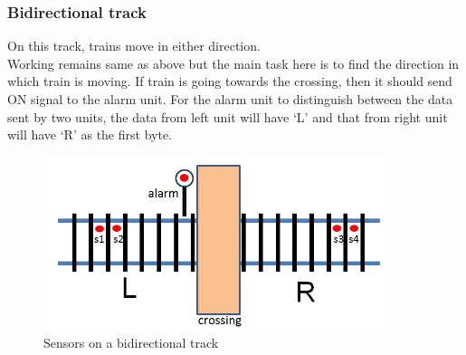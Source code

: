 \documentclass[aps,letterpaper,11pt]{article}
\begin{document}
\subsubsection{Bidirectional track}
On this track, trains move in either direction.\\
Working remains same as above but the main task here is to find the direction
in which train is moving. If train is going towards the crossing, then it
should send ON signal to the alarm unit. For the alarm unit to distinguish
between the data sent by two units, the data from left unit will
have `L' and that from right unit will have `R' as the first byte.
\begin{figure}[H]
\begin{center}
\includegraphics[height = 2in,width=4in,angle=00]{figures/twoSideSensors.JPG}
\caption{\small Sensors on a bidirectional track}
\end{center}
\end{figure}
\newpage
\end{document}
